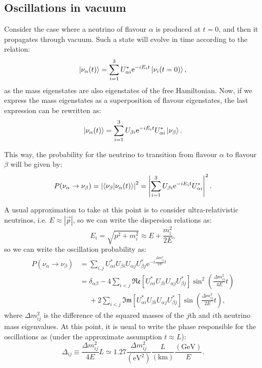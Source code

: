 \subsection{Oscillations in vacuum}

Consider the case where a neutrino of flavour $\alpha$ is produced at $t=0$, and then it propagates through vacuum. Such a state will evolve in time according to the relation:
\begin{equation}\label{2.3}
\ket{\nu_{\alpha}(t)} = \sum_{i=1}^{3} U^{*}_{\alpha i} \mathrm{e}^{-iE_{i}t} \ket{\nu_{i}(t=0)},
\end{equation}
as the mass eigenstates are also eigenstates of the free Hamiltonian. Now, if we express the mass eigenstates as a superposition of flavour eigenstates, the last expression can be rewritten as:
\begin{equation}\label{2.4}
\ket{\nu_{\alpha}(t)} = \sum_{i=1}^{3} U_{\beta i} \mathrm{e}^{-iE_{i}t} U^{*}_{\alpha i} \ket{\nu_{\beta}}.
\end{equation}

This way, the probability for the neutrino to transition from flavour $\alpha$ to flavour $\beta$ will be given by:
\begin{equation}\label{2.5}
P(\nu_{\alpha} \rightarrow \nu_{\beta}) = \left|\braket{\nu_{\beta}}{\nu_{\alpha}(t)}\right|^{2}=\left|\sum_{i=1}^{3} U_{\beta i} \mathrm{e}^{-iE_{i}t} U^{*}_{\alpha i}\right|^{2}.
\end{equation}

A usual approximation to take at this point is to consider ultra-relativistic neutrinos, i.e. $E \approx \left|\vec{p}\right|$, so we can write the dispersion relations as:
\begin{equation}\label{2.6}
E_{i} = \sqrt{p^{2} + m_{i}^{2}} \approx E + \frac{m_{i}^{2}}{2 E},
\end{equation}
so we can write the oscillation probability as:
\begin{equation}\label{2.7}
\begin{split}
P(\nu_{\alpha} \rightarrow \nu_{\beta}) &= \sum_{i,j} U^{*}_{\alpha i} U_{\beta i} U_{\alpha j} U^{*}_{\beta j} \mathrm{e}^{-i\frac{\Delta m^{2}_{ij}}{2E}t}\\
&=\delta_{\alpha\beta} - 4 \sum_{i<j} \mathfrak{Re}\left[U^{*}_{\alpha i} U_{\beta i} U_{\alpha j} U^{*}_{\beta j}\right] \sin^{2}\left(\frac{\Delta m^{2}_{ij}}{4E}t\right)\\
&\phantom{=}+ 2  \sum_{i<j} \mathfrak{Im}\left[U^{*}_{\alpha i} U_{\beta i} U_{\alpha j} U^{*}_{\beta j}\right] \sin\left(\frac{\Delta m^{2}_{ij}}{2E}t\right),
\end{split}
\end{equation}
where $\Delta m^{2}_{ij}$ is the difference of the squared masses of the $j$th and $i$th neutrino mass eigenvalues. At this point, it is usual to write the phase responsible for the oscillations as (under the approximate assumption $t \approx L$):
\begin{equation}\label{2.8}
\Delta_{ij} \equiv \frac{\Delta m^{2}_{ij}}{4E}L \simeq 1.27 \frac{\Delta m^{2}_{ij}}{(\mathrm{eV}^{2})} \frac{L}{(\mathrm{km})} \frac{(\mathrm{GeV})}{E}.
\end{equation}

